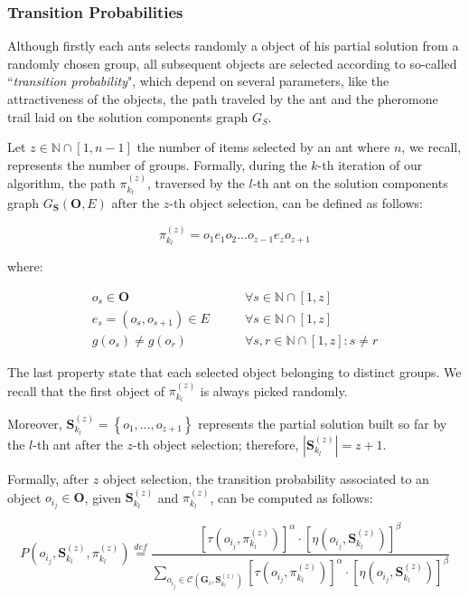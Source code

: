 \documentclass[12pt,a4paper]{report}
\newcommand{\mathDef}{\overset{\textit{def}}{=}}
\newcommand{\N}{\mathbb{N}}
\newcommand{\SetFromOneTo}[1]{\N \cap \left[1,#1\right]}
\newcommand{\ItalicQuotMark}[1]{``\textit{#1}"}
\begin{document}
\newpage

\subsubsection{Transition Probabilities}

Although firstly each ants selects randomly a object of his partial solution from a randomly chosen group, all subsequent objects are selected according to so-called \ItalicQuotMark{transition probability}, which depend on several parameters, like the 
attractiveness of the objects, the path traveled by the ant and the pheromone trail laid on the solution components graph $G_{S\textbf{}}$.

Let $z \in \SetFromOneTo{n-1}$ the number of items selected by an ant where $n$, we recall, represents the number of groups. Formally, during the $k$-th iteration of our algorithm, the path $\pi_{k_l}^{(z)}$, traversed by the $l$-th ant on the solution components graph $G_{\textbf{S}}(\textbf{O},E)$ after the $z$-th object selection, can be defined as follows:

\begin{equation}
	\pi_{k_l}^{(z)} = o_1e_1o_2 \ldots o_{z-1}e_{z}o_{z+1}
\end{equation} 

where:

\begin{eqnarray}
	o_s \in \textbf{O} & \qquad \forall s \in \SetFromOneTo{z} \\
	e_s = (o_s,o_{s+1}) \in E  & \qquad \forall s \in \SetFromOneTo{z} \\
	g(o_s) \neq g(o_r)   &\qquad \forall s,r \in \SetFromOneTo{z} : s \neq r
\end{eqnarray}

The last property state that each selected object belonging to distinct groups. We recall that the first object of $\pi_{k_l}^{(z)}$ is always picked randomly.

Moreover, $\textbf{S}_{k_l}^{(z)} = \left\{o_1,\ldots,o_{z+1}\right\}$ represents the partial solution built so far by the $l$-th ant after the $z$-th object selection; therefore, $|\textbf{S}_{k_l}^{(z)}| = z + 1$.  

Formally, after $z$ object selection, the transition probability associated to an object $o_{i_j} \in \textbf{O}$, given $\textbf{S}_{k_l}^{(z)}$ and $\pi_{k_l}^{(z)}$, can be computed as follows:

\begin{equation}
	P(o_{i_j}, \textbf{S}_{k_l}^{(z)}, \pi_{k_l}^{(z)}) \mathDef \frac{\left[ \tau( o_{i_j}, \pi_{k_l}^{(z)}) \right]^{\alpha} \cdot \left[ \eta( o_{i_j}, \textbf{S}_{k_l}^{(z)}) \right]^{\beta}}{\displaystyle \sum_{o_{i_j} \in \mathcal{C}(\textbf{G}_i, \textbf{S}_{k_l}^{(z)})} \left[ \tau( o_{i_j}, \pi_{k_l}^{(z)}) \right]^{\alpha} \cdot \left[ \eta( o_{i_j}, \textbf{S}_{k_l}^{(z)}) \right]^{\beta}}
\end{equation}
\end{document}
